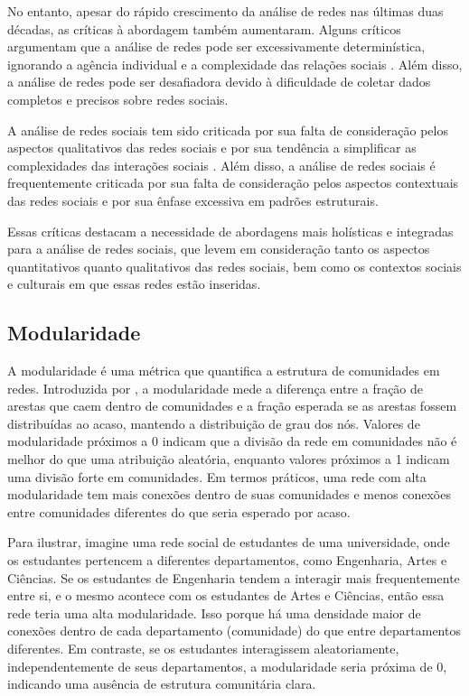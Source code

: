 No entanto, apesar do rápido crescimento da análise de redes nas últimas duas décadas, as críticas à abordagem também aumentaram. Alguns críticos argumentam que a análise de redes pode ser excessivamente determinística, ignorando a agência individual e a complexidade das relações sociais \cite{1991_Scott}. Além disso, a análise de redes pode ser desafiadora devido à dificuldade de coletar dados completos e precisos sobre redes sociais.

A análise de redes sociais tem sido criticada por sua falta de consideração pelos aspectos qualitativos das redes sociais e por sua tendência a simplificar as complexidades das interações sociais \cite{2013_Gruzd}. Além disso, a análise de redes sociais é frequentemente criticada por sua falta de consideração pelos aspectos contextuais das redes sociais e por sua ênfase excessiva em padrões estruturais.

Essas críticas destacam a necessidade de abordagens mais holísticas e integradas para a análise de redes sociais, que levem em consideração tanto os aspectos quantitativos quanto qualitativos das redes sociais, bem como os contextos sociais e culturais em que essas redes estão inseridas.

\subsection*{Modularidade}

A modularidade é uma métrica que quantifica a estrutura de comunidades em redes. Introduzida por \cite{2004_Newman}, a modularidade mede a diferença entre a fração de arestas que caem dentro de comunidades e a fração esperada se as arestas fossem distribuídas ao acaso, mantendo a distribuição de grau dos nós. Valores de modularidade próximos a 0 indicam que a divisão da rede em comunidades não é melhor do que uma atribuição aleatória, enquanto valores próximos a 1 indicam uma divisão forte em comunidades. Em termos práticos, uma rede com alta modularidade tem mais conexões dentro de suas comunidades e menos conexões entre comunidades diferentes do que seria esperado por acaso.

Para ilustrar, imagine uma rede social de estudantes de uma universidade, onde os estudantes pertencem a diferentes departamentos, como Engenharia, Artes e Ciências. Se os estudantes de Engenharia tendem a interagir mais frequentemente entre si, e o mesmo acontece com os estudantes de Artes e Ciências, então essa rede teria uma alta modularidade. Isso porque há uma densidade maior de conexões dentro de cada departamento (comunidade) do que entre departamentos diferentes. Em contraste, se os estudantes interagissem aleatoriamente, independentemente de seus departamentos, a modularidade seria próxima de 0, indicando uma ausência de estrutura comunitária clara.

